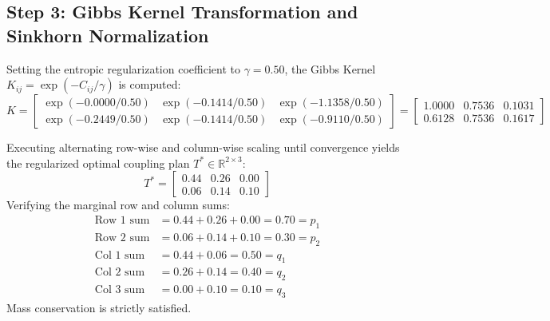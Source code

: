 \subsection{Step 3: Gibbs Kernel Transformation and Sinkhorn Normalization}
Setting the entropic regularization coefficient to $\gamma = 0.50$, the Gibbs Kernel $K_{ij} = \exp(-C_{ij}/\gamma)$ is computed:
\begin{equation}
    K = \begin{bmatrix}
        \exp(-0.0000 / 0.50) & \exp(-0.1414 / 0.50) & \exp(-1.1358 / 0.50) \\
        \exp(-0.2449 / 0.50) & \exp(-0.1414 / 0.50) & \exp(-0.9110 / 0.50)
    \end{bmatrix} = \begin{bmatrix}
        1.0000 & 0.7536 & 0.1031 \\
        0.6128 & 0.7536 & 0.1617
    \end{bmatrix}
\end{equation}

Executing alternating row-wise and column-wise scaling until convergence yields the regularized optimal coupling plan $T^* \in \mathbb{R}^{2 \times 3}$:
\begin{equation}
    T^* = \begin{bmatrix}
        0.44 & 0.26 & 0.00 \\
        0.06 & 0.14 & 0.10
    \end{bmatrix}
\end{equation}
Verifying the marginal row and column sums:
\begin{align}
    \text{Row 1 sum} &= 0.44 + 0.26 + 0.00 = \mathbf{0.70} = p_1 \\
    \text{Row 2 sum} &= 0.06 + 0.14 + 0.10 = \mathbf{0.30} = p_2 \\
    \text{Col 1 sum} &= 0.44 + 0.06 = \mathbf{0.50} = q_1 \\
    \text{Col 2 sum} &= 0.26 + 0.14 = \mathbf{0.40} = q_2 \\
    \text{Col 3 sum} &= 0.00 + 0.10 = \mathbf{0.10} = q_3
\end{align}
Mass conservation is strictly satisfied.

